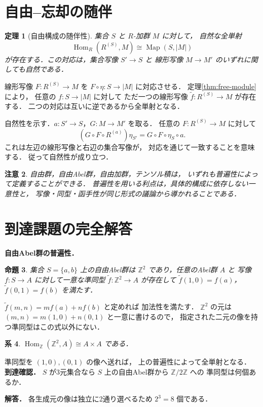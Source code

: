 \documentclass[a5paper,10pt,onecolumn]{jsarticle}
\makeatletter
\theoremstyle{mathnotetheorem}
\newtheorem{theorem}{定理}[section]
\newtheorem{proposition}[theorem]{命題}
\newtheorem{corollary}[theorem]{系}
\newtheorem{remark}[theorem]{注意}
\renewcommand{\proofname}{証明}
\renewenvironment{proof}[1][\proofname]{%
  \par\pushQED{\qed}\normalfont\topsep4\p@\@plus2\p@\relax
  \trivlist\item[\hskip\labelsep\bfseries #1]\ignorespaces
}{\popQED\endtrivlist\@endpefalse}
\makeatother
\begin{document}
\section{自由--忘却の随伴}

\begin{theorem}[自由構成の随伴性]\label{thm:free-forgetful}
集合 $S$ と $R$-加群 $M$ に対して，
自然な全単射
\[
 \operatorname{Hom}_R(R^{(S)},M)
 \cong\operatorname{Map}(S,|M|)
\]
が存在する．この対応は，集合写像 $S'\to S$ と
線形写像 $M\to M'$ のいずれに関しても自然である．
\end{theorem}
\begin{proof}
線形写像 $F:R^{(S)}\to M$ を
$F\circ\eta:S\to|M|$ に対応させる．
定理\ref{thm:free-module}により，
任意の $f:S\to|M|$ に対して
ただ一つの線形写像 $\widetilde f:R^{(S)}\to M$ が存在する．
二つの対応は互いに逆であるから全単射となる．

自然性を示す．$a:S'\to S$，$G:M\to M'$ を取る．
任意の $F:R^{(S)}\to M$ に対して
\[
 (G\circ F\circ R^{(a)})\eta_{S'}
 =G\circ F\circ\eta_S\circ a.
\]
これは左辺の線形写像と右辺の集合写像が，
対応を通じて一致することを意味する．
従って自然性が成り立つ．
\end{proof}

\begin{remark}
自由群，自由Abel群，自由加群，テンソル積は，
いずれも普遍性によって定義することができる．
普遍性を用いる利点は，具体的構成に依存しない一意性と，
写像・同型・函手性が同じ形式の議論から導かれることである．
\end{remark}


\section{到達課題の完全解答}
\noindent\textbf{自由Abel群の普遍性．}
\begin{proposition}
集合 $S=\{a,b\}$ 上の自由Abel群は
$\mathbb Z^2$ であり，任意のAbel群 $A$ と
写像 $f:S\to A$ に対して一意な準同型
$\widetilde f:\mathbb Z^2\to A$ が存在して
$\widetilde f(1,0)=f(a)$，
$\widetilde f(0,1)=f(b)$ を満たす．
\end{proposition}
\begin{proof}
$\widetilde f(m,n)=mf(a)+nf(b)$ と定めれば
加法性を満たす．
$\mathbb Z^2$ の元は
$(m,n)=m(1,0)+n(0,1)$ と一意に書けるので，
指定された二元の像を持つ準同型はこの式以外にない．
\end{proof}
\begin{corollary}
$\operatorname{Hom}_{\mathbb Z}(\mathbb Z^2,A)
\cong A\times A$ である．
\end{corollary}
\begin{proof}
準同型を $(1,0),(0,1)$ の像へ送れば，
上の普遍性によって全単射となる．
\end{proof}
\noindent\textbf{到達確認．}
$S$ が3元集合なら
$S$ 上の自由Abel群から $\mathbb Z/2\mathbb Z$ への
準同型は何個あるか．
\par\noindent\textbf{解答．}
各生成元の像は独立に2通り選べるため
$2^3=8$ 個である．
\end{document}
